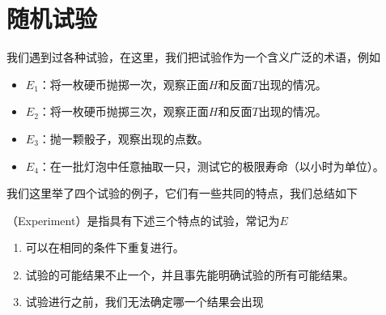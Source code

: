 \section{随机试验}
我们遇到过各种试验，在这里，我们把试验作为一个含义广泛的术语，例如
\begin{itemize}
    \item $E_1$：将一枚硬币抛掷一次，观察正面$H$和反面$T$出现的情况。
    \item $E_2$：将一枚硬币抛掷三次，观察正面$H$和反面$T$出现的情况。 
    \item $E_3$：抛一颗骰子，观察出现的点数。
    \item $E_4$：在一批灯泡中任意抽取一只，测试它的极限寿命（以小时为单位）。
\end{itemize}
我们这里举了四个试验的例子，它们有一些共同的特点，我们总结如下
\begin{BoxDefinition}[随机试验]
    （Experiment）是指具有下述三个特点的试验，常记为$E$
    \begin{enumerate}
        \item 可以在相同的条件下重复进行。
        \item 试验的可能结果不止一个，并且事先能明确试验的所有可能结果。
        \item 试验进行之前，我们无法确定哪一个结果会出现
    \end{enumerate}
\end{BoxDefinition}

